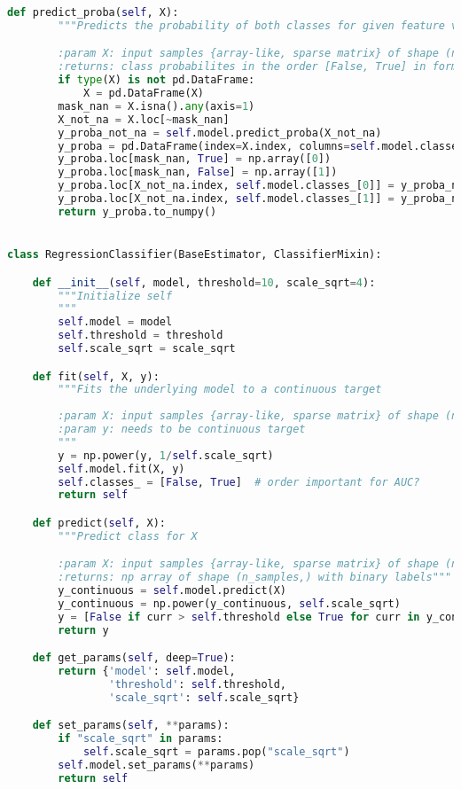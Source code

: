 \begin{lstlisting}[language=Python, basicstyle=\scriptsize, tabsize=4]
    def predict_proba(self, X):
        """Predicts the probability of both classes for given feature vectors

        :param X: input samples {array-like, sparse matrix} of shape (n_samples, n_features}
        :returns: class probabilites in the order [False, True] in form (n_samples,2)"""
        if type(X) is not pd.DataFrame:
            X = pd.DataFrame(X)
        mask_nan = X.isna().any(axis=1)
        X_not_na = X.loc[~mask_nan]
        y_proba_not_na = self.model.predict_proba(X_not_na)
        y_proba = pd.DataFrame(index=X.index, columns=self.model.classes_)
        y_proba.loc[mask_nan, True] = np.array([0])
        y_proba.loc[mask_nan, False] = np.array([1])
        y_proba.loc[X_not_na.index, self.model.classes_[0]] = y_proba_not_na[:, 0]
        y_proba.loc[X_not_na.index, self.model.classes_[1]] = y_proba_not_na[:, 1]
        return y_proba.to_numpy()


class RegressionClassifier(BaseEstimator, ClassifierMixin):

    def __init__(self, model, threshold=10, scale_sqrt=4):
        """Initialize self
        """
        self.model = model
        self.threshold = threshold
        self.scale_sqrt = scale_sqrt

    def fit(self, X, y):
        """Fits the underlying model to a continuous target
        
        :param X: input samples {array-like, sparse matrix} of shape (n_samples, n_features}
        :param y: needs to be continuous target
        """
        y = np.power(y, 1/self.scale_sqrt)
        self.model.fit(X, y)
        self.classes_ = [False, True]  # order important for AUC?
        return self

    def predict(self, X):
        """Predict class for X

        :param X: input samples {array-like, sparse matrix} of shape (n_samples, n_features}
        :returns: np array of shape (n_samples,) with binary labels"""
        y_continuous = self.model.predict(X)
        y_continuous = np.power(y_continuous, self.scale_sqrt)
        y = [False if curr > self.threshold else True for curr in y_continuous]
        return y

    def get_params(self, deep=True):
        return {'model': self.model,
                'threshold': self.threshold,
                'scale_sqrt': self.scale_sqrt}

    def set_params(self, **params):
        if "scale_sqrt" in params:
            self.scale_sqrt = params.pop("scale_sqrt")
        self.model.set_params(**params)
        return self


\end{lstlisting}
